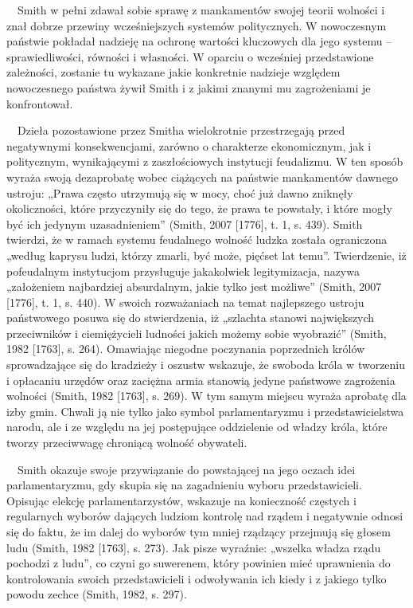 \documentclass[a4paper]{article}
\begin{document}
 \ \ Smith w pełni zdawał sobie sprawę z mankamentów swojej teorii wolności i znał dobrze przewiny wcześniejszych
systemów politycznych. W nowoczesnym państwie pokładał nadzieję na ochronę wartości kluczowych dla jego systemu –
sprawiedliwości, równości i własności. W oparciu o wcześniej przedstawione zależności, zostanie tu wykazane jakie
konkretnie nadzieje względem nowoczesnego państwa żywił Smith i z jakimi znanymi mu zagrożeniami je konfrontował.

\ \ Dzieła pozostawione przez Smitha wielokrotnie przestrzegają przed negatywnymi konsekwencjami, zarówno o charakterze
ekonomicznym, jak i politycznym, wynikającymi z zaszłościowych instytucji feudalizmu. W ten sposób wyraża swoją
dezaprobatę wobec ciążących na państwie mankamentów dawnego ustroju: „Prawa często utrzymują się w mocy, choć już dawno
zniknęły okoliczności, które przyczyniły się do tego, że prawa te powstały, i które mogły być ich jedynym
uzasadnieniem” \label{ref:RNDulI78tI5NW}(Smith, 2007 [1776], t. 1, s. 439). Smith twierdzi, że w ramach systemu
feudalnego wolność ludzka została ograniczona „według kaprysu ludzi, którzy zmarli, być może, pięćset lat temu”.
Twierdzenie, iż pofeudalnym instytucjom przysługuje jakakolwiek legitymizacja, nazywa „założeniem najbardziej
absurdalnym, jakie tylko jest możliwe” \label{ref:RNDSUPttSQRMo}(Smith, 2007 [1776], t. 1, s. 440). W swoich
rozważaniach na temat najlepszego ustroju państwowego posuwa się do stwierdzenia, iż „szlachta stanowi największych
przeciwników i ciemiężycieli ludności jakich możemy sobie wyobrazić” \label{ref:RND0qdGYLZow2}(Smith, 1982 [1763], s.
264). Omawiając niegodne poczynania poprzednich królów sprowadzające się do kradzieży i oszustw wskazuje, że swoboda
króla w tworzeniu i opłacaniu urzędów oraz zaciężna armia stanowią jedyne państwowe zagrożenia wolności
\label{ref:RNDcctWJa8WzG}(Smith, 1982 [1763], s. 269). W tym samym miejscu wyraża aprobatę dla izby gmin. Chwali ją nie
tylko jako symbol parlamentaryzmu i przedstawicielstwa narodu, ale i ze względu na jej postępujące oddzielenie od
władzy króla, które tworzy przeciwwagę chroniącą wolność obywateli.

 \ \ Smith okazuje swoje przywiązanie do powstającej na jego oczach idei parlamentaryzmu, gdy skupia się na zagadnieniu
wyboru przedstawicieli. Opisując elekcję parlamentarzystów, wskazuje na konieczność częstych i regularnych wyborów
dających ludziom kontrolę nad rządem i negatywnie odnosi się do faktu, że im dalej do wyborów tym mniej rządzący
przejmują się głosem ludu \label{ref:RNDGWDyLHaXiI}(Smith, 1982 [1763], s. 273). Jak pisze wyraźnie: „wszelka władza
rządu pochodzi z ludu”, co czyni go suwerenem, który powinien mieć uprawnienia do kontrolowania swoich przedstawicieli
i odwoływania ich kiedy i z jakiego tylko powodu zechce \label{ref:RND8CG5fqpymD}(Smith, 1982, s. 297).
\end{document}
